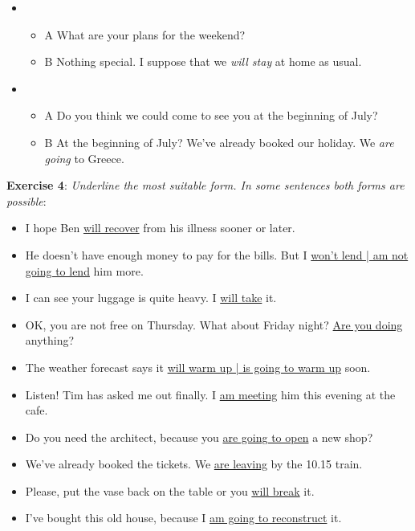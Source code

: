 \begin{itemize}
\item
\begin{itemize}
\item A What are your plans for the weekend?
\item B Nothing special. I suppose that we \textit{will stay} at home as usual.
\end{itemize}

\item
\begin{itemize}
\item A Do you think we could come to see you at the beginning of July?
\item B At the beginning of July? We've already booked our holiday. We \textit{are going} to Greece.
\end{itemize}

\end{itemize}

\textbf{Exercise 4}: \textit{Underline the most suitable form. In some sentences both forms are possible}:

\begin{itemize}

\item I hope Ben \underline{will recover} from his illness sooner or later.
\item He doesn't have enough money to pay for the bills. \newline But I \underline{won't lend | am not going to lend} him more.
\item I can see your luggage is quite heavy. I \underline{will take} it.
\item OK, you are not free on Thursday. What about Friday night? \underline{Are you doing} anything?
\item The weather forecast says it \underline{will warm up | is going to warm up} soon.
\item Listen! Tim has asked me out finally. I \underline{am meeting} him this evening at the cafe.
\item Do you need the architect, because you \underline{are going to open} a new shop?
\item We've already booked the tickets. We \underline{are leaving} by the 10.15 train.
\item Please, put the vase back on the table or you \underline{will break} it.
\item I've bought this old house, because I \underline{am going to reconstruct} it.

\end{itemize}

